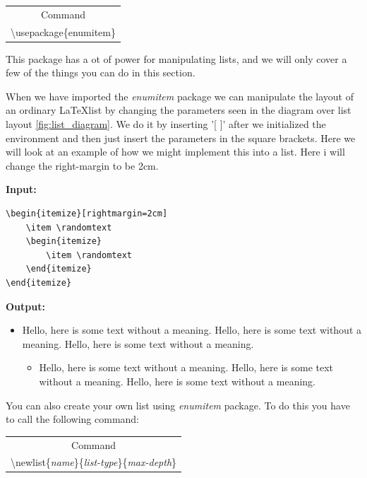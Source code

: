 \documentclass{article}
\newcommand{\jbs}[1]{\textbackslash{}#1} %
\newcommand{\randomtext}{Hello, here is some text without a meaning. Hello, here is some text without a meaning. Hello, here is some text without a meaning.} %
\begin{document}
\begin{table} [H]
    \centering\begin{tabular}{|c|} \hline
        \rowcolor{gray!30}
        Command \\
        \jbs{usepackage\{enumitem\}} \\ \hline
    \end{tabular}
\end{table} %

This package has a ot of power for manipulating lists, and we will only cover a few of the things you can do in this section.

When we have imported the \textit{enumitem} package we can manipulate the layout of an ordinary \LaTeX list by changing the parameters seen in the diagram over list layout \ref{fig:list_diagram}. We do it by inserting '[ ]' after we initialized the environment and then just insert the parameters in the square brackets.
 Here we will look at an example of how we might implement this into a list. Here i will change the right-margin to be 2cm.
 
 
\begin{multicols}{2}
\textbf{Input: }
\begin{verbatim}
\begin{itemize}[rightmargin=2cm]
    \item \randomtext
    \begin{itemize}
        \item \randomtext
    \end{itemize}
\end{itemize}
\end{verbatim}
\newcolumn

\textbf{Output:} \\
\begin{itemize}[rightmargin=2cm]
    \item \randomtext
    \begin{itemize}
        \item \randomtext
    \end{itemize}
\end{itemize}

You can also create your own list using \textit{enumitem} package. To do this you have to call the following command:

\begin{table} [H]
    \centering\begin{tabular}{|c|} \hline
        \rowcolor{gray!30}
        Command \\
        \jbs{newlist\{\textit{name}\}\{\textit{list-type}\}\{\textit{max-depth}\}} \\ \hline
    \end{tabular}
\end{table} %
\end{multicols}
\end{document}
